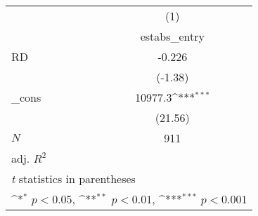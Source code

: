 {
\def\sym#1{\ifmmode^{#1}\else\(^{#1}\)\fi}
\begin{tabular}{l*{1}{c}}
\toprule
            &\multicolumn{1}{c}{(1)}\\
            &\multicolumn{1}{c}{estabs\_entry}\\
\midrule
RD          &      -0.226         \\
            &     (-1.38)         \\
\addlinespace
\_cons      &     10977.3\sym{***}\\
            &     (21.56)         \\
\midrule
\(N\)       &         911         \\
adj. \(R^{2}\)&                     \\
\bottomrule
\multicolumn{2}{l}{\footnotesize \textit{t} statistics in parentheses}\\
\multicolumn{2}{l}{\footnotesize \sym{*} \(p<0.05\), \sym{**} \(p<0.01\), \sym{***} \(p<0.001\)}\\
\end{tabular}
}
